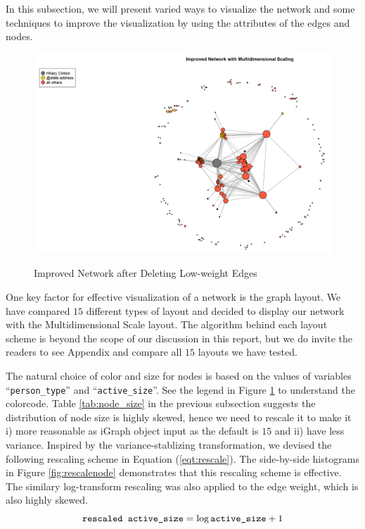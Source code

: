 In this subsection, we will present varied ways to visualize the network and some techniques to improve the visualization by using the attributes of the edges and nodes.

\begin{figure}[ht]
\centering
\includegraphics[width = 1\textwidth]{zoe/report_dms_layout}
\label{fig:improvednw}
\caption{Improved Network after Deleting Low-weight Edges}
\end{figure}

One key factor for effective visualization of a network is the graph layout. We have compared $15$ different types of layout and decided to display our network with the Multidimensional Scale layout. The algorithm behind each layout scheme is beyond the scope of our discussion in this report, but we do invite the readers to see Appendix   and compare all $15$ layouts we have tested.

The natural choice of color and size for nodes is based on the values of variables ``\verb+person_type+'' and ``\verb+active_size+''. See the legend in Figure \ref{fig:improvednw} to understand the colorcode. Table \ref{tab:node_size} in the previous subsection suggests the distribution of node size is highly skewed, hence we need to rescale it to make it i) more reasonable as iGraph object input as the default is $15$ and ii) have less variance. Inspired by the variance-stablizing transformation, we devised the following rescaling scheme in Equation (\ref{eqt:rescale}). The side-by-side histograms in Figure \ref{fig:rescalenode} demonstrates that this rescaling scheme is effective. The similary log-transform rescaling was also applied to the edge weight, which is also highly skewed.
\begin{equation}
\label{eqt:rescale}
\verb+rescaled active_size+ = \log \verb+active_size+ + 1
\end{equation}

